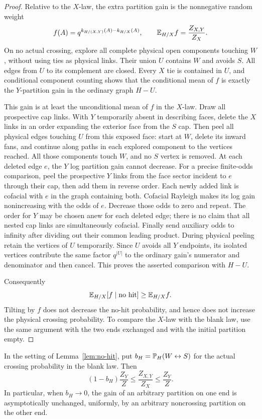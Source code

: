 \begin{proof}
Relative to the $X$-law, the extra partition gain is the nonnegative
random weight
\[
 f(A)=q^{k_{H/(X,Y)}(A)-k_{H/X}(A)},
 \qquad \mathbb E_{H/X}f=\frac{Z_{X,Y}}{Z_X}.
\]
On no actual crossing, explore all complete physical open components
touching $W$, without using ties as physical links.  Their union $U$
contains $W$ and avoids $S$.  All edges from $U$ to its complement
are closed.  Every $X$ tie is contained in $U$, and conditional
component counting shows that the conditional mean of $f$ is exactly
the $Y$-partition gain in the ordinary graph $H-U$.

This gain is at least the unconditional mean of $f$ in the $X$-law.
Draw all prospective cap links.  With $Y$ temporarily absent in
describing faces, delete the $X$ links in an order expanding the
exterior face from the $S$ cap.  Then peel all physical edges touching
$U$ from this exposed face: start at $W$, delete its inward fans, and
continue along paths in each explored component to the vertices
reached.  All those components touch $W$, and no $S$ vertex is removed.
At each deleted edge $e$, the $Y$ log partition gain cannot decrease.
For a precise finite-odds comparison, peel the prospective $Y$ links
from the face sector incident to $e$ through their cap, then add them
in reverse order.  Each newly added link is cofacial with $e$ in
the graph containing both.  Cofacial Rayleigh makes its log gain
nonincreasing with the odds of $e$.  Decrease those odds to zero and
repeat.  The order for $Y$ may be chosen anew for each deleted edge;
there is no claim that all nested cap links are simultaneously
cofacial.  Finally send auxiliary odds to infinity after dividing
out their common leading product.  During physical peeling retain
the vertices of $U$ temporarily.  Since $U$ avoids all $Y$ endpoints,
its isolated vertices contribute the same factor $q^{|U|}$ to the
ordinary gain's numerator and denominator and then cancel.  This proves
the asserted comparison with
$H-U$.

Consequently
\[
 \mathbb E_{H/X}[f\mid\text{no hit}]\ge\mathbb E_{H/X}f.
\]
Tilting by $f$ does not decrease the no-hit probability, and hence does not increase
the physical crossing probability.  To compare the $X$-law with
the blank law, use the same argument with the two ends exchanged
and with the initial partition empty.
\end{proof}

\begin{lemma}
\label{lem:separate-caps}
In the setting of Lemma~\ref{lem:no-hit}, put
$b_H=\mathbb P_H(W\leftrightarrow S)$ for the actual crossing probability
in the blank law.  Then
\begin{equation}
 (1-b_H)\frac{Z_Y}{Z}
 \le\frac{Z_{X,Y}}{Z_X}
 \le\frac{Z_Y}{Z}.
 \label{rect:separate-cap-gains}
\end{equation}
In particular, when $b_H\to0$, the gain of an arbitrary partition on
one end is asymptotically unchanged, uniformly, by an arbitrary
noncrossing partition on the other end.
\end{lemma}

